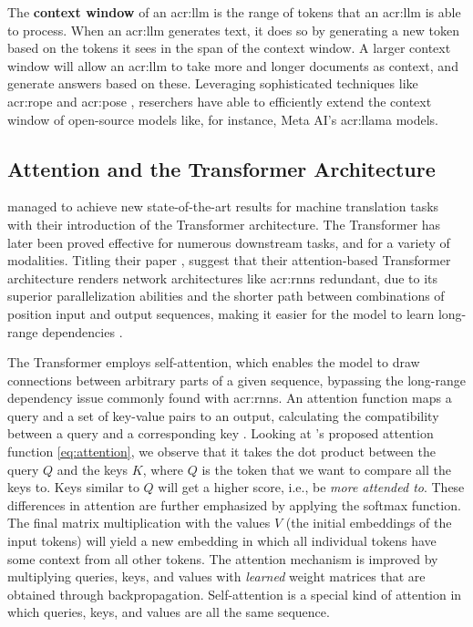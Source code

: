The \textbf{context window} of an \acrshort{acr:llm} is the range of tokens that an \acrshort{acr:llm} is able to process. When an \acrshort{acr:llm} generates text, it does so by generating a new token based on the tokens it sees in the span of the context window. A larger context window will allow an \acrshort{acr:llm} to take more and longer documents as context, and generate answers based on these. Leveraging sophisticated techniques like \gls{acr:rope} \citep{suRoFormerEnhancedTransformer2024} and \gls{acr:pose} \citep{zhuPoSEEfficientContext2024}, reserchers have able to efficiently extend the context window of open-source models like, for instance, Meta AI's \acrshort{acr:llama} models.


\subsection{Attention and the Transformer Architecture}
\label{subsec:attention-and-the-transformer-architecture}

\cite{vaswaniAttentionAllYou2017} managed to achieve new state-of-the-art results for machine translation tasks with their introduction of the Transformer architecture. The Transformer has later been proved effective for numerous downstream tasks, and for a variety of modalities. Titling their paper , \citeauthor{vaswaniAttentionAllYou2017} suggest that their attention-based Transformer architecture renders network architectures like \glspl{acr:rnn} redundant, due to its superior parallelization abilities and the shorter path between combinations of position input and output sequences, making it easier for the model to learn long-range dependencies \citep[6]{vaswaniAttentionAllYou2017}.

The Transformer employs self-attention, which enables the model to draw connections between arbitrary parts of a given sequence, bypassing the long-range dependency issue commonly found with \glspl{acr:rnn}. An attention function maps a query and a set of key-value pairs to an output, calculating the compatibility between a query and a corresponding key \citep[3]{vaswaniAttentionAllYou2017}. Looking at \citeauthor{vaswaniAttentionAllYou2017}'s proposed attention function \eqref{eq:attention}, we observe that it takes the dot product between the query $Q$ and the keys $K$, where $Q$ is the token that we want to compare all the keys to. Keys similar to $Q$ will get a higher score, i.e., be \textit{more attended to}. These differences in attention are further emphasized by applying the softmax function. The final matrix multiplication with the values $V$ (the initial embeddings of the input tokens) will yield a new embedding in which all individual tokens have some context from all other tokens. The attention mechanism is improved by multiplying queries, keys, and values with \textit{learned} weight matrices that are obtained through backpropagation. Self-attention is a special kind of attention in which queries, keys, and values are all the same sequence.

